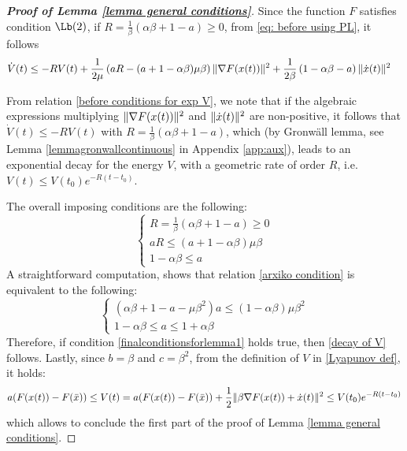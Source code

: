 \documentclass[reqno]{amsart}
\theoremstyle{plain}
\theoremstyle{definition}
\theoremstyle{remark}
\DeclarePairedDelimiter{\norm}{\lVert}{\rVert}	%
\begin{document}
\begin{proof}[\textbf{Proof of Lemma \ref{lemma general conditions}}]
	Since the function $F$ satisfies condition \hyperref[PL]{$\Lb(2)$}, if $R = \frac{1}{\beta}\left(\alpha\beta+1-a\right)\geq 0$, from \eqref{eq: before using PL}, it follows
	\begin{equation}\label{before conditions for exp V}
		\begin{aligned}
			\dot{V}(t) & \leq -R V(t) +\frac{1}{2\mu}\left(aR - (a+1-\alpha\beta )\mu\beta\right)\norm{\nabla F(x(t))}^{2} +\frac{1}{2\beta}\left(1-\alpha\beta -a\right)\norm{\dot{x}(t)}^{2} 
		\end{aligned}
	\end{equation}
	
	From relation \eqref{before conditions for exp V}, we note that if the algebraic expressions multiplying $\norm{\nabla F(x(t))}^{2}$ and $\norm{\dot{x}(t)}^{2}$ are non-positive, it follows that $\dot{V}(t)\leq -RV(t)$ with $R=\frac{1}{\beta}\left(\alpha\beta+1-a\right)$, which (by Gronw\"all lemma, see Lemma \ref{lemmagronwallcontinuous} in Appendix \ref{app:aux}), leads to an exponential decay for the energy $V$, with a geometric rate of order $R$, i.e. $V(t) \leq V(t_{0})e^{-R(t-t_{0})}$.
	
	The overall imposing conditions are the following:
	\begin{equation}\label{arxiko condition}
		\begin{cases}
			R = \frac{1}{\beta}\left(\alpha\beta +1 -a\right) \geq0 \\
			aR \leq \left(a+1-\alpha\beta \right)\mu\beta  \\
			1-\alpha\beta\leq a
		\end{cases}
	\end{equation}  
	A straightforward computation, shows that relation \eqref{arxiko condition} is equivalent to the following:
	\begin{equation}\label{finalconditionsforlemma1}
		\begin{cases}
			\left(\alpha\beta +1 -a - \mu\beta^{2}\right)a \leq (1-\alpha\beta)\mu\beta^{2} \\
			1-\alpha\beta \leq a \leq 1+\alpha\beta
		\end{cases}
	\end{equation}
	Therefore, if condition \eqref{finalconditionsforlemma1} holds true, then \eqref{decay of V} follows. 
	Lastly, since $b=\beta$ and $c=\beta^{2}$, from the definition of $V$ in \eqref{Lyapunov def}, it holds:
	\begin{equation}
		a(F(x(t))-F(\bar{x})) \leq V(t)=a(F(x(t))-F(\bar{x})) +\frac{1}{2}\norm{\beta\nabla F(x(t))+\dot{x}(t)}^{2} \leq V(t_{0})e^{-R(t-t_{0})}
	\end{equation}
	which allows to conclude the first part of the proof of Lemma \ref{lemma general conditions}.
	

\end{proof}
\end{document}
